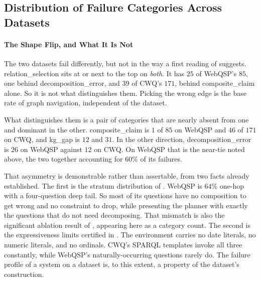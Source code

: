 \subsection{Distribution of Failure Categories Across
Datasets}\label{sec:failure-distribution}

\begin{table}[!tbp]
  \begin{center}
    \caption[The merged failure histogram]{The merged failure histogram, $n =
    256$. Wrong and hedge are kept separate. Counts come from
    \textsf{scripts/synthesize\_census.py} over the three label sources of
    . The table body is generated from
    \textsf{results/phase4/thesis\_numbers.json}.}
    \label{tab:histogram}
    \small
    
  \end{center}
\end{table}

\paragraph{The Shape Flip, and What It Is Not}

The two datasets fail differently, but not in the way a first reading of
 suggests. \textsf{relation\_selection} sits at or next to
the top on \emph{both}. It has $25$ of WebQSP's $85$, one behind
\textsf{decomposition\_error}, and $39$ of CWQ's $171$, behind
\textsf{composite\_claim} alone. So it is not what distinguishes them. Picking
the wrong edge is the base rate of graph navigation, independent of the dataset.

What distinguishes them is a pair of categories that are nearly absent from one
and dominant in the other. \textsf{composite\_claim} is $1$ of $85$ on WebQSP
and $46$ of $171$ on CWQ, and \textsf{kg\_gap} is $12$ and $31$. In the other
direction, \textsf{decomposition\_error} is $26$ on WebQSP against $12$ on CWQ.
On WebQSP that is the near-tie noted above, the two together accounting for
$60\%$ of its failures.

That asymmetry is demonstrable rather than assertable, from two facts already
established. The first is the stratum distribution of .
WebQSP is $64\%$ one-hop with a four-question deep tail. So most of its
questions have no composition to get wrong and no constraint to drop, while
presenting the planner with exactly the questions that do not need decomposing.
That mismatch is also the significant ablation result of ,
appearing here as a category count. The second is the expressiveness limits
certified in . The environment carries no date literals,
no numeric literals, and no ordinals. CWQ's SPARQL templates invoke all three
constantly, while WebQSP's naturally-occurring questions rarely do. The failure
profile of a system on a dataset is, to this extent, a property of the dataset's
construction.

